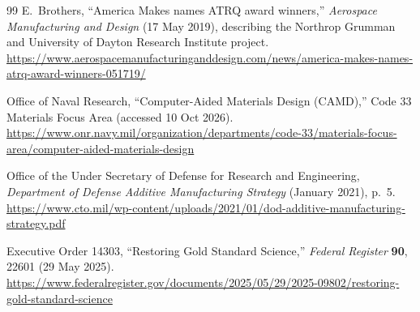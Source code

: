 \documentclass[12pt,letterpaper]{article}
\begin{document}
\begin{thebibliography}{99}
E.~Brothers, ``America Makes names ATRQ award winners,'' \emph{Aerospace
Manufacturing and Design} (17 May 2019), describing the Northrop Grumman and
University of Dayton Research Institute project.
\url{https://www.aerospacemanufacturinganddesign.com/news/america-makes-names-atrq-award-winners-051719/}

Office of Naval Research, ``Computer-Aided Materials Design (CAMD),'' Code 33
Materials Focus Area (accessed 10 Oct 2026).
\url{https://www.onr.navy.mil/organization/departments/code-33/materials-focus-area/computer-aided-materials-design}

Office of the Under Secretary of Defense for Research and Engineering,
\emph{Department of Defense Additive Manufacturing Strategy} (January 2021),
p.~5.
\url{https://www.cto.mil/wp-content/uploads/2021/01/dod-additive-manufacturing-strategy.pdf}

Executive Order 14303, ``Restoring Gold Standard Science,'' \emph{Federal
Register} \textbf{90}, 22601 (29 May 2025).
\url{https://www.federalregister.gov/documents/2025/05/29/2025-09802/restoring-gold-standard-science}

\end{thebibliography}
\end{document}
